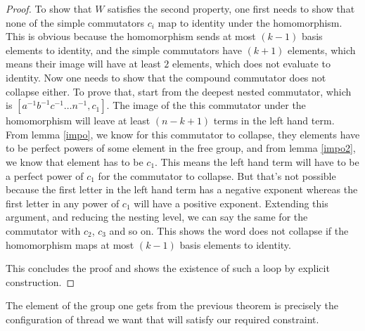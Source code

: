 \documentclass[12pt]{article}
\theoremstyle{definition}
\begin{document}
\begin{proof}
To show that $W$ satisfies the second property, one first needs to show that none of the simple commutators $c_i$ map to identity under the homomorphism. This is obvious because the homomorphism sends at most $(k-1)$ basis elements to identity, and the simple commutators have $(k+1)$ elements, which means their image will have at least $2$ elements, which does not evaluate to identity. Now one needs to show that the compound commutator does not collapse either. To prove that, start from the deepest nested commutator, which is $[a^{-1}b^{-1}c^{-1}\ldots n^{-1}, c_1]$. The image of the this commutator under the homomorphism will leave at least $(n-k+1)$ terms in the left hand term. From lemma \autoref{impo}, we know for this commutator to collapse, they elements have to be perfect powers of some element in the free group, and from lemma \autoref{impo2}, we know that element has to be $c_1$. This means the left hand term will have to be a perfect power of $c_1$ for the commutator to collapse. But that's not possible because the first letter in the left hand term has a negative exponent whereas the first letter in any power of $c_1$ will have a positive exponent. Extending this argument, and reducing the nesting level, we can say the same for the commutator with $c_2$, $c_3$ and so on. This shows the word does not collapse if the homomorphism maps at most $(k-1)$ basis elements to identity.

This concludes the proof and shows the existence of such a loop by explicit construction.
\end{proof}

The element of the group one gets from the previous theorem is precisely the configuration of thread we want that will satisfy our required constraint.
\end{document}
